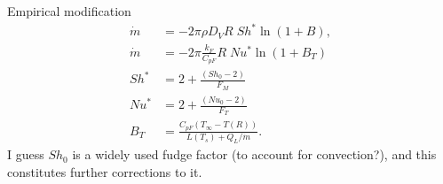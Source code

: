 \documentclass[12pt,twoside]{report}
\begin{document}
Empirical modification \cite{Abramzon1988}
\begin{align}
  \dot{m} &= - 2\pi \rho D_V R \; Sh^* \ln{(1 + B)}, \\
  \dot{m} &= - 2\pi \frac{k_F}{C_{pF}} R \; Nu^* \ln{(1 + B_T)} \\
  Sh^* &= 2 + \frac{(Sh_0 - 2)}{F_M} \\
  Nu^* &= 2 + \frac{(Nu_0 - 2)}{F_T} \\
  B_T &= \frac{C_{pF} (T_\infty - T(R))}{L(T_s) + Q_L / \dot{m}}.
\end{align}
I guess $Sh_0$ is a widely used fudge factor (to account for convection?), and this constitutes further corrections to it.



\end{document}

